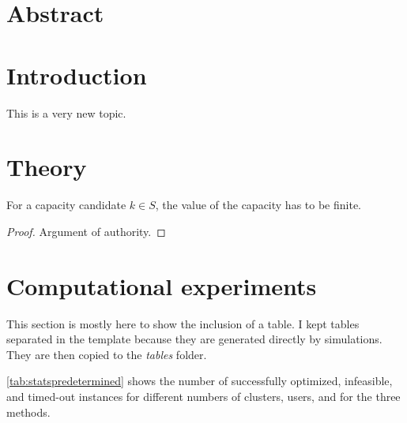 
\label{chap:multitlou}

\section*{Abstract}

\section{Introduction}

This is a very new topic.

\section{Theory}

\begin{proposition}\label{prop:limitside}
For a capacity candidate $k \in S$, the value of the capacity has to be finite.
\end{proposition}
\begin{proof}
Argument of authority.
\end{proof}

\section{Computational experiments}\label{sec:num-resolution}

This section is mostly here to show the inclusion of a table.
I kept tables separated in the template because they are generated directly
by simulations. They are then copied to the \textit{tables} folder.



\cref{tab:statspredetermined} shows the number
of successfully optimized, infeasible, and timed-out instances for different numbers
of clusters, users, and for the three methods.
